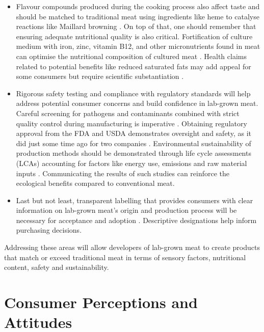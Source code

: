 \documentclass[10pt]{article}
\begin{document}
\begin{sloppypar}
\begin{itemize}

    \item Flavour compounds produced during the cooking process also affect taste and should be matched to traditional meat using ingredients like heme to catalyse reactions like Maillard browning \citep{post_cultured_2012}. On top of that, one should remember that ensuring adequate nutritional quality is also critical. Fortification of culture medium with iron, zinc, vitamin B12, and other micronutrients found in meat can optimise the nutritional composition of cultured meat \citep{fraeye_sensorial_2020}. Health claims related to potential benefits like reduced saturated fats may add appeal for some consumers but require scientific substantiation \citep{sergelidis_lab_2019}.

    \item Rigorous safety testing and compliance with regulatory standards will help address potential consumer concerns and build confidence in lab-grown meat. Careful screening for pathogens and contaminants combined with strict quality control during manufacturing is imperative \citep{ong_food_2021}. Obtaining regulatory approval from the FDA and USDA demonstrates oversight and safety, as it did just some time ago for two companies \citep{mccarthy_usda_nodate}. Environmental sustainability of production methods should be demonstrated through life cycle assessments (LCAs) accounting for factors like energy use, emissions and raw material inputs \citep{mattick_anticipatory_2015}. Communicating the results of such studies can reinforce the ecological benefits compared to conventional meat.

    \item Last but not least, transparent labelling that provides consumers with clear information on lab-grown meat’s origin and production process will be necessary for acceptance and adoption \citep{failla_evaluation_2023}. Descriptive designations help inform purchasing decisions.
  \end{itemize}
  Addressing these areas will allow developers of lab-grown meat to create products that match or exceed traditional meat in terms of sensory factors, nutritional content, safety and sustainability.

  \section{Consumer Perceptions and Attitudes}
  \label{sec:consumer-perceptions-and-attitudes}


\end{sloppypar}
\end{document}

